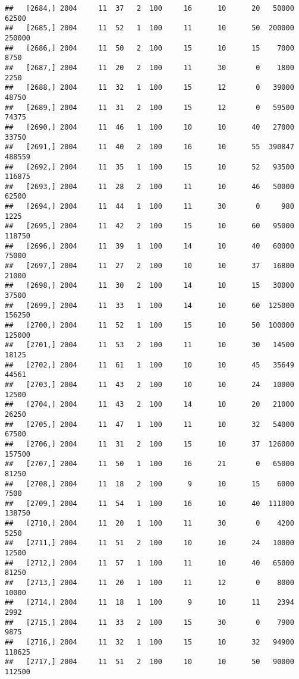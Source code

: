 \documentclass{article}\usepackage[]{graphicx}\usepackage[]{color}
\makeatletter
\newenvironment{kframe}{%
 \def\at@end@of@kframe{}%
 \ifinner\ifhmode%
  \def\at@end@of@kframe{\end{minipage}}%
  \begin{minipage}{\columnwidth}%
 \fi\fi%
 \def\FrameCommand##1{\hskip\@totalleftmargin \hskip-\fboxsep
 \colorbox{shadecolor}{##1}\hskip-\fboxsep
     \hskip-\linewidth \hskip-\@totalleftmargin \hskip\columnwidth}%
 \MakeFramed {\advance\hsize-\width
   \@totalleftmargin\z@ \linewidth\hsize
   \@setminipage}}%
 {\par\unskip\endMakeFramed%
 \at@end@of@kframe}
\newenvironment{knitrout}{}{} %
\makeatother
\begin{document}
\begin{knitrout}
\begin{kframe}
\begin{verbatim}
##   [2684,] 2004     11  37   2  100     16      10      20   50000   62500
##   [2685,] 2004     11  52   1  100     11      10      50  200000  250000
##   [2686,] 2004     11  50   2  100     15      10      15    7000    8750
##   [2687,] 2004     11  20   2  100     11      30       0    1800    2250
##   [2688,] 2004     11  32   1  100     15      12       0   39000   48750
##   [2689,] 2004     11  31   2  100     15      12       0   59500   74375
##   [2690,] 2004     11  46   1  100     10      10      40   27000   33750
##   [2691,] 2004     11  40   2  100     16      10      55  390847  488559
##   [2692,] 2004     11  35   1  100     15      10      52   93500  116875
##   [2693,] 2004     11  28   2  100     11      10      46   50000   62500
##   [2694,] 2004     11  44   1  100     11      30       0     980    1225
##   [2695,] 2004     11  42   2  100     15      10      60   95000  118750
##   [2696,] 2004     11  39   1  100     14      10      40   60000   75000
##   [2697,] 2004     11  27   2  100     10      10      37   16800   21000
##   [2698,] 2004     11  30   2  100     14      10      15   30000   37500
##   [2699,] 2004     11  33   1  100     14      10      60  125000  156250
##   [2700,] 2004     11  52   1  100     15      10      50  100000  125000
##   [2701,] 2004     11  53   2  100     11      10      30   14500   18125
##   [2702,] 2004     11  61   1  100     10      10      45   35649   44561
##   [2703,] 2004     11  43   2  100     10      10      24   10000   12500
##   [2704,] 2004     11  43   2  100     14      10      20   21000   26250
##   [2705,] 2004     11  47   1  100     11      10      32   54000   67500
##   [2706,] 2004     11  31   2  100     15      10      37  126000  157500
##   [2707,] 2004     11  50   1  100     16      21       0   65000   81250
##   [2708,] 2004     11  18   2  100      9      10      15    6000    7500
##   [2709,] 2004     11  54   1  100     16      10      40  111000  138750
##   [2710,] 2004     11  20   1  100     11      30       0    4200    5250
##   [2711,] 2004     11  51   2  100     10      10      24   10000   12500
##   [2712,] 2004     11  57   1  100     11      10      40   65000   81250
##   [2713,] 2004     11  20   1  100     11      12       0    8000   10000
##   [2714,] 2004     11  18   1  100      9      10      11    2394    2992
##   [2715,] 2004     11  33   2  100     15      30       0    7900    9875
##   [2716,] 2004     11  32   1  100     15      10      32   94900  118625
##   [2717,] 2004     11  51   2  100     10      10      50   90000  112500

\end{verbatim}
\end{kframe}
\end{knitrout}
\end{document}
